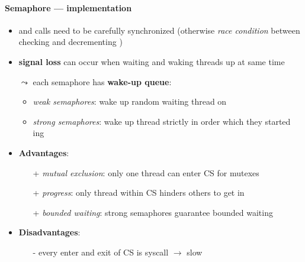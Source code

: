 \paragraph{Semaphore --- implementation}
\begin{itemize}
  \item {} and  calls need to be carefully synchronized (otherwise \emph{race condition} between checking and decrementing )
  \item \textbf{signal loss} can occur when waiting and waking threads up at same time
  \item[$ \leadsto $] each semaphore has \textbf{wake-up queue}:
  \begin{itemize}
    \item \emph{weak semaphores}: wake up random waiting thread on 
    \item \emph{strong semaphores}: wake up thread strictly in order which they started ing
  \end{itemize}
  \item \textbf{Advantages}:
  \begin{itemize}
    \item[+] \emph{mutual exclusion}: only one thread can enter CS for mutexes
    \item[+] \emph{progress}: only thread within CS hinders others to get in
    \item[+] \emph{bounded waiting}: strong semaphores guarantee bounded waiting
  \end{itemize}
  \item \textbf{Disadvantages}:
  \begin{itemize}
    \item[-] every enter and exit of CS is syscall \( \to \) slow
  \end{itemize}
\end{itemize}

